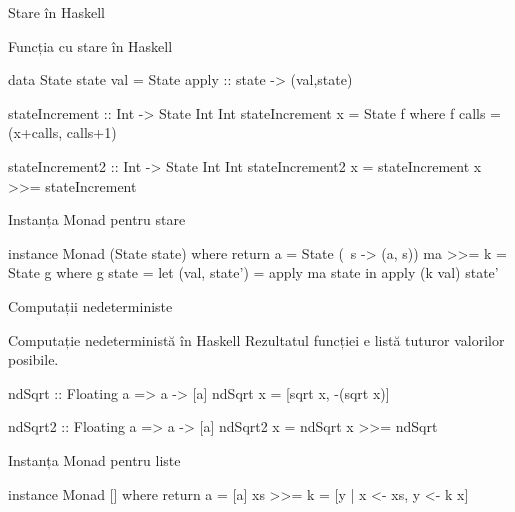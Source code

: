 \documentclass[xcolor=pdftex,romanian,colorlinks]{beamer}
\begin{document}
\begin{frame}[fragile]{Stare în Haskell}
\begin{block}{Funcția cu stare în Haskell}
\vspace{-2ex}
\begin{asciihs}
data State state val = State {apply :: state -> (val,state)}

stateIncrement :: Int -> State Int Int
stateIncrement x = State f
  where f calls = (x+calls, calls+1)

stateIncrement2 :: Int -> State Int Int
stateIncrement2 x = stateIncrement x >>= stateIncrement
\end{asciihs}
\end{block}
\begin{block}{Instanța Monad pentru stare}
\vspace{-2ex}
\begin{asciihs}
instance Monad (State state) where
  return a = State (\ s -> (a, s)) 
  ma >>= k = State g
    where g state = let (val, state') = apply ma state 
                     in apply (k val) state'
\end{asciihs}
\end{block}
\end{frame}

\begin{frame}[fragile]{Computații nedeterministe}
\begin{block}{Computație nedeterministă în Haskell}
Rezultatul funcției e listă tuturor valorilor posibile.
\begin{asciihs}
ndSqrt :: Floating a => a -> [a]
ndSqrt x = [sqrt x, -(sqrt x)]

ndSqrt2 :: Floating a => a -> [a]
ndSqrt2 x = ndSqrt x >>= ndSqrt
\end{asciihs}
\end{block}

\begin{block}{Instanța Monad pentru liste}
\vspace{-2ex}
\begin{asciihs}
instance Monad [] where
  return a = [a] 
  xs >>= k = [y | x <- xs, y <- k x]
\end{asciihs}
\end{block}
\end{frame}
\end{document}
